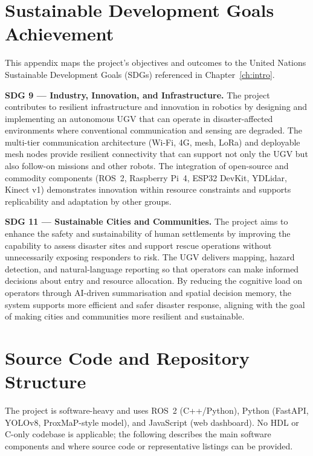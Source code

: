 
\chapter{Sustainable Development Goals Achievement}
\label{app:sdg}

This appendix maps the project's objectives and outcomes to the United Nations Sustainable Development Goals (SDGs) referenced in Chapter~\ref{ch:intro}.

\textbf{SDG 9 --- Industry, Innovation, and Infrastructure.} The project contributes to resilient infrastructure and innovation in robotics by designing and implementing an autonomous UGV that can operate in disaster-affected environments where conventional communication and sensing are degraded. The multi-tier communication architecture (Wi-Fi, 4G, mesh, LoRa) and deployable mesh nodes provide resilient connectivity that can support not only the UGV but also follow-on missions and other robots. The integration of open-source and commodity components (ROS~2, Raspberry Pi~4, ESP32 DevKit, YDLidar, Kinect v1) demonstrates innovation within resource constraints and supports replicability and adaptation by other groups.

\textbf{SDG 11 --- Sustainable Cities and Communities.} The project aims to enhance the safety and sustainability of human settlements by improving the capability to assess disaster sites and support rescue operations without unnecessarily exposing responders to risk. The UGV delivers mapping, hazard detection, and natural-language reporting so that operators can make informed decisions about entry and resource allocation. By reducing the cognitive load on operators through AI-driven summarisation and spatial decision memory, the system supports more efficient and safer disaster response, aligning with the goal of making cities and communities more resilient and sustainable.

\chapter{Source Code and Repository Structure}
\label{app:code}

The project is software-heavy and uses ROS~2 (C++/Python), Python (FastAPI, YOLOv8, ProxMaP-style model), and JavaScript (web dashboard). No HDL or C-only codebase is applicable; the following describes the main software components and where source code or representative listings can be provided.

